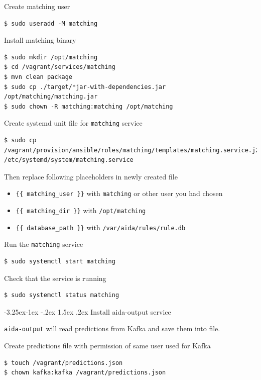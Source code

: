 \documentclass[a4paper]{article} %
\makeatletter
\renewcommand{\normalsize}{\fontsize{12}{15}\selectfont\color{textcolor}}
\renewcommand\subsubsection{\@startsection{subsubsection}{3}{\z@}%
                   {-3.25ex\@plus -1ex \@minus -.2ex}%
                   {1.5ex \@plus .2ex}%
                   {\normalfont\normalsize\sffamily\bfseries\color{projectcolor}}}
\makeatother
\begin{document}
Create matching user
\begin{lstlisting}
$ sudo useradd -M matching
\end{lstlisting}

Install matching binary
\begin{lstlisting}
$ sudo mkdir /opt/matching
$ cd /vagrant/services/matching
$ mvn clean package
$ sudo cp ./target/*jar-with-dependencies.jar /opt/matching/matching.jar
$ sudo chown -R matching:matching /opt/matching
\end{lstlisting}

Create systemd unit file for \texttt{matching} service
\begin{lstlisting}
$ sudo cp /vagrant/provision/ansible/roles/matching/templates/matching.service.j2 /etc/systemd/system/matching.service
\end{lstlisting}

Then replace following placeholders in newly created file
\begin{itemize}
\item \texttt{\{\{ matching\_user \}\}} with \texttt{matching} or other user you had chosen
\item \texttt{\{\{ matching\_dir \}\}} with \texttt{/opt/matching}
\item \texttt{\{\{ database\_path \}\}} with \texttt{/var/aida/rules/rule.db}
\end{itemize}

Run the \texttt{matching} service
\begin{lstlisting}
$ sudo systemctl start matching
\end{lstlisting}

Check that the service is running
\begin{lstlisting}
$ sudo systemctl status matching
\end{lstlisting}


\subsubsection{Install aida-output service}

\texttt{aida-output} will read predictions from Kafka and save them into file.

Create predictions file with permission of same user used for Kafka
\begin{lstlisting}
$ touch /vagrant/predictions.json
$ chown kafka:kafka /vagrant/predictions.json
\end{lstlisting}
\end{document}
